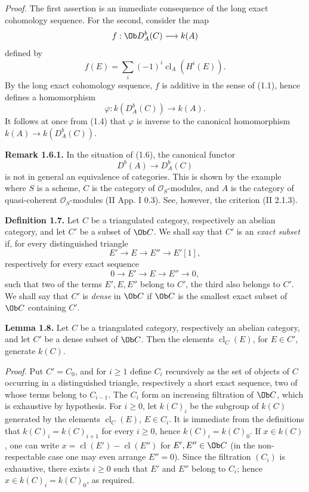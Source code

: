 \documentclass[11pt]{article}
\newcommand{\cl}{\operatorname{cl}}
\begin{document}
\emph{Proof.} The first assertion is an immediate consequence of the long exact cohomology sequence. For the second, consider the map
\[
 f:\Ob D_A^b(C)\longrightarrow k(A)
\]
defined by
\[
 f(E)=\sum_i(-1)^i\cl_A(H^i(E)).
\]
By the long exact cohomology sequence, \(f\) is additive in the sense of (1.1), hence defines a homomorphism
\[
 \varphi:k(D_A^b(C))\longrightarrow k(A).
\]
It follows at once from (1.4) that \(\varphi\) is inverse to the canonical homomorphism \(k(A)\to k(D_A^b(C))\).

\textbf{Remark 1.6.1.} In the situation of (1.6), the canonical functor
\[
 D^b(A)\longrightarrow D_A^b(C)
\]
is not in general an equivalence of categories. This is shown by the example where \(S\) is a scheme, \(C\) is the category of \(\mathcal O_S\)-modules, and \(A\) is the category of quasi-coherent \(\mathcal O_S\)-modules (II App. I 0.3). See, however, the criterion (II 2.1.3).

\textbf{Definition 1.7.} Let \(C\) be a triangulated category, respectively an abelian category, and let \(C'\) be a subset of \(\Ob C\). We shall say that \(C'\) is an \emph{exact subset} if, for every distinguished triangle
\[
 E'\longrightarrow E\longrightarrow E''\longrightarrow E'[1],
\]
respectively for every exact sequence
\[
 0\longrightarrow E'\longrightarrow E\longrightarrow E''\longrightarrow0,
\]
such that two of the terms \(E',E,E''\) belong to \(C'\), the third also belongs to \(C'\). We shall say that \(C'\) is \emph{dense} in \(\Ob C\) if \(\Ob C\) is the smallest exact subset of \(\Ob C\) containing \(C'\).

\textbf{Lemma 1.8.} Let \(C\) be a triangulated category, respectively an abelian category, and let \(C'\) be a dense subset of \(\Ob C\). Then the elements \(\cl_C(E)\), for \(E\in C'\), generate \(k(C)\).

\emph{Proof.} Put \(C'=C_0\), and for \(i\geq1\) define \(C_i\) recursively as the set of objects of \(C\) occurring in a distinguished triangle, respectively a short exact sequence, two of whose terms belong to \(C_{i-1}\). The \(C_i\) form an increasing filtration of \(\Ob C\), which is exhaustive by hypothesis. For \(i\geq0\), let \(k(C)_i\) be the subgroup of \(k(C)\) generated by the elements \(\cl_C(E)\), \(E\in C_i\). It is immediate from the definitions that \(k(C)_i=k(C)_{i+1}\) for every \(i\geq0\), hence \(k(C)_i=k(C)_0\). If \(x\in k(C)\), one can write \(x=\cl(E')-\cl(E'')\) for \(E',E''\in\Ob C\) (in the non-respectable case one may even arrange \(E''=0\)). Since the filtration \((C_i)\) is exhaustive, there exists \(i\geq0\) such that \(E'\) and \(E''\) belong to \(C_i\); hence \(x\in k(C)_i=k(C)_0\), as required.
\end{document}
